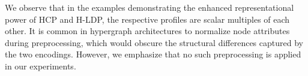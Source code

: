 \begin{rmk}
    We observe that in the examples demonstrating the enhanced representational power of HCP and H-LDP, the respective profiles are scalar multiples of each other. It is common in hypergraph architectures to normalize node attributes during preprocessing, which would obscure the structural differences captured by the two encodings. However, we emphasize that no such preprocessing is applied in our experiments.
\end{rmk}


